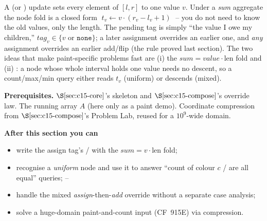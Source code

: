 \begin{topicintro}
A  (or ) update sets every element of \([l,r]\) to one value \(v\).  Under a \emph{sum} aggregate the node fold is a closed form \(\;t_v \leftarrow v\cdot(r_v-l_v+1)\;\) -- you do not need to know the old values, only the length.  The pending tag is simply ``the value I owe my children,'' \(\mathit{tag}_v\in\{v\text{ or }\texttt{none}\}\); a later assignment overrides an earlier one, and \emph{any} assignment overrides an earlier add/flip (the rule proved last section).  The two ideas that make paint-specific problems fast are (i) the \(\mathit{sum}=\mathit{value}\cdot\text{len}\) fold and (ii) : a node whose whole interval holds one value needs no descent, so a count/max/min query either reads \(t_v\) (uniform) or descends (mixed).

\textbf{Prerequisites.} \(\secref{c15-core}\)'s skeleton and \(\secref{c15-compose}\)'s override law.  The running array \(A\) (here only as a paint demo).  Coordinate compression from \(\secref{c15-compose}\)'s Problem Lab, reused for a \(10^9\)-wide domain.

\textbf{After this section you can}
\begin{itemize}[nosep]
  \item write the assign tag's / with the \(\mathit{sum}=v\cdot\text{len}\) fold; \hfill{}
  \item recognise a \emph{uniform} node and use it to answer ``count of colour \(c\) / are all equal'' queries; \hfill{}--
  \item handle the mixed \emph{assign}-then-\emph{add} override without a separate case analysis; \hfill{}
  \item solve a huge-domain paint-and-count input (CF~915E) via compression. \hfill{}
\end{itemize}
\end{topicintro}

